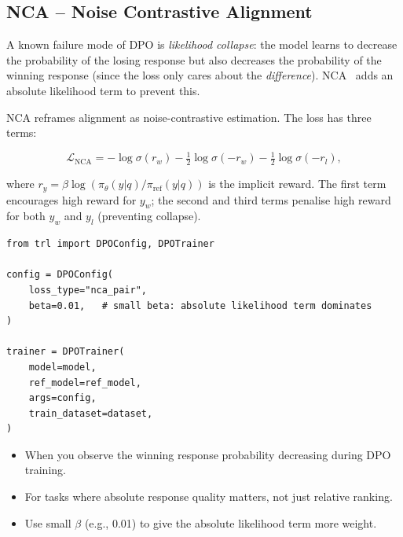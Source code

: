 \subsection{NCA -- Noise Contrastive Alignment}
\label{sec:nca}

\begin{intuitionbox}
A known failure mode of DPO is \emph{likelihood collapse}: the model learns to decrease the probability of the losing response but also decreases the probability of the winning response (since the loss only cares about the \emph{difference}). NCA~\cite{chen2024nca} adds an absolute likelihood term to prevent this.
\end{intuitionbox}

NCA reframes alignment as noise-contrastive estimation. The loss has three terms:

\[
\boxed{
    \mathcal{L}_{\text{NCA}} =
      -\log \sigma(r_w)
      - \tfrac{1}{2}\log \sigma(-r_w)
      - \tfrac{1}{2}\log \sigma(-r_l),
  }
\]

where $r_y = \beta \log(\pi_\theta(y|q)/\pi_{\text{ref}}(y|q))$ is the implicit reward. The first term encourages high reward for $y_w$; the second and third terms penalise high reward for both $y_w$ and $y_l$ (preventing collapse).

\begin{examplebox}
\begin{lstlisting}[style=pythonstyle]
from trl import DPOConfig, DPOTrainer

config = DPOConfig(
    loss_type="nca_pair",
    beta=0.01,   # small beta: absolute likelihood term dominates
)

trainer = DPOTrainer(
    model=model,
    ref_model=ref_model,
    args=config,
    train_dataset=dataset,
)
\end{lstlisting}
\end{examplebox}

\begin{keybox}
\begin{itemize}
  \item When you observe the winning response probability decreasing during DPO training.
  \item For tasks where absolute response quality matters, not just relative ranking.
  \item Use small $\beta$ (e.g., 0.01) to give the absolute likelihood term more weight.
\end{itemize}
\end{keybox}

